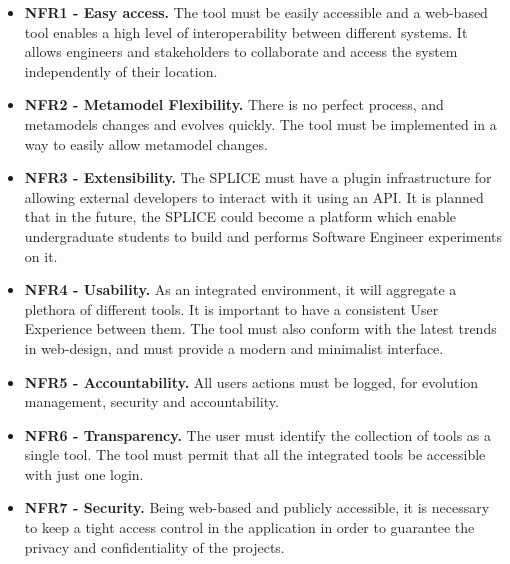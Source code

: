 \begin{itemize}
\item  \textbf{ NFR1 - Easy access. } The tool must be easily accessible and a web-based tool enables a high level of interoperability between different systems. It allows engineers and stakeholders to collaborate and access the system independently of their location.

\item  \textbf{ NFR2 - Metamodel Flexibility. } There is no perfect process, and metamodels changes and evolves quickly. The tool must be implemented in a way to easily allow metamodel changes.


\item  \textbf{ NFR3 - Extensibility. } The \ac{SPLICE} must have a plugin infrastructure for allowing external developers to interact with it using an API. It is planned that in the future, the \ac{SPLICE} could become a platform which enable undergraduate students to build and performs Software Engineer experiments on it.

\item  \textbf{ NFR4 - Usability. } As an integrated environment, it will aggregate a plethora of different tools. It is important to have a consistent User Experience between them. The tool must also conform with the latest trends in web-design, and must provide a modern and minimalist interface.

\item  \textbf{ NFR5 - Accountability. } All users actions must be logged, for evolution management, security and accountability. 

\item  \textbf{ NFR6 - Transparency. } The user must identify the collection of tools as a single tool. The tool must permit that all the integrated tools be accessible with just one login.

\item  \textbf{ NFR7 - Security. } Being web-based and publicly accessible, it is necessary to keep a tight access control in the application in order to guarantee the privacy and confidentiality of the projects.


\end{itemize}


